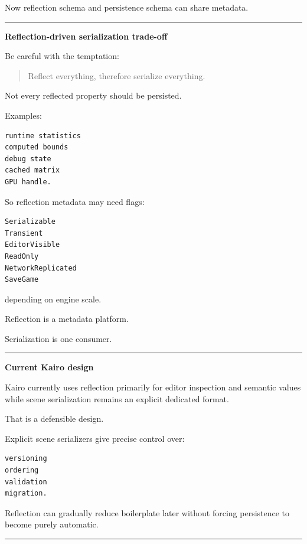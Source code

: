 Now reflection schema and persistence schema can share metadata.

\begin{center}\rule{0.5\linewidth}{0.5pt}\end{center}

\textbf{Reflection-driven serialization trade-off}

Be careful with the temptation:

\begin{quote}
Reflect everything, therefore serialize everything.
\end{quote}

Not every reflected property should be persisted.

Examples:

\begin{verbatim}
runtime statistics
computed bounds
debug state
cached matrix
GPU handle.
\end{verbatim}

So reflection metadata may need flags:

\begin{verbatim}
Serializable
Transient
EditorVisible
ReadOnly
NetworkReplicated
SaveGame
\end{verbatim}

depending on engine scale.

Reflection is a metadata platform.

Serialization is one consumer.

\begin{center}\rule{0.5\linewidth}{0.5pt}\end{center}

\textbf{Current Kairo design}

Kairo currently uses reflection primarily for editor inspection and semantic values while scene serialization remains an explicit dedicated format.

That is a defensible design.

Explicit scene serializers give precise control over:

\begin{verbatim}
versioning
ordering
validation
migration.
\end{verbatim}

Reflection can gradually reduce boilerplate later without forcing persistence to become purely automatic.

\begin{center}\rule{0.5\linewidth}{0.5pt}\end{center}

